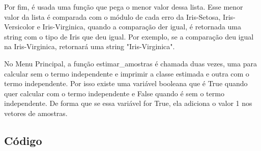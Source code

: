 \documentclass[a4paper,12pt,twoside]{article}
\begin{document}
Por fim, é usada uma função que pega o menor valor dessa lista. Esse menor valor da lista é comparada com o módulo de cada erro da Iris-Setosa, Iris-Versicolor e Iris-Virginica, quando a comparação der igual, é retornada uma string com o tipo de Iris que deu igual. Por exemplo, se a comparação deu igual na Iris-Virginica, retornará uma string "Iris-Virginica".

No Menu Principal, a função estimar\_amostras é chamada duas vezes, uma para calcular sem o termo independente e imprimir a classe estimada e outra com o termo independente. Por isso existe uma variável booleana que é True quando quer calcular com o termo independente e False quando é sem o termo independente. De forma que se essa variável for True, ela adiciona o valor 1 nos vetores de amostras.

\subsection{Código}
\end{document}

